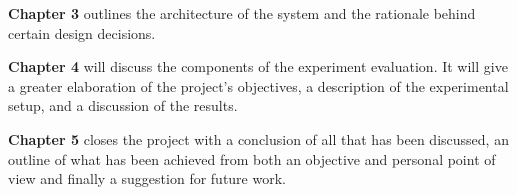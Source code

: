 \textbf{Chapter 3} outlines the architecture of the system and the rationale behind certain design decisions.

\textbf{Chapter 4} will discuss the components of the experiment evaluation. It will give a greater elaboration of the project's objectives, a description of the experimental setup, and a discussion of the results.

\textbf{Chapter 5} closes the project with a conclusion of all that has been discussed, an outline of what has been achieved from both an objective and personal point of view and finally a suggestion for future work.

